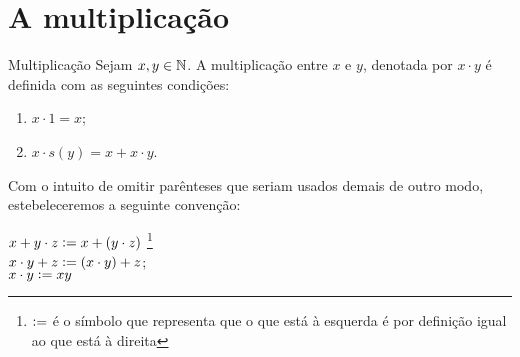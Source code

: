 \documentclass[../main.tex]{subfiles}
\begin{document}
\section{A multiplicação}
\begin{defi}{Multiplicação}\label{def-multiplicacao-N}
    Sejam $x, y \in \mathbb{N}$. A multiplicação entre $x$ e $y$, denotada por $x \cdot y$ é definida com as seguintes condições: 
	\begin{enumerate}[label=(\roman*)]
		\item $x \cdot 1 = x$;
		\item $x \cdot s(y) = x + x \cdot y$.
	\end{enumerate}
\end{defi}
\begin{obs}
	Com o intuito de omitir parênteses que seriam usados demais de outro modo, estebeleceremos a seguinte convenção: 
	\begin{center}
    	$x + y \cdot z \vcentcolon= x + (y \cdot z)$ \footnote{$\vcentcolon=$ é o símbolo que representa que o que está à esquerda é por definição igual ao que está à direita} \\
    	$x \cdot y + z \vcentcolon= (x \cdot y) + z$; \\
    	$x \cdot y \vcentcolon= xy$	    
	\end{center}

\end{obs}
\end{document}
